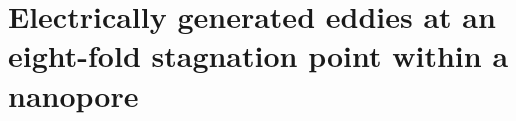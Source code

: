 \chapter{Electrically generated eddies at an eight-fold stagnation point
within a nanopore}\label{chpt:eddies}
%
%
%
%
%

%

%

